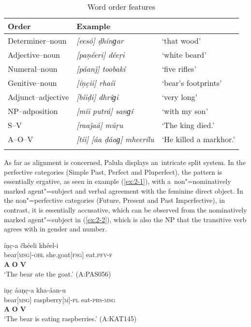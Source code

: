 \begin{table}[ht]
\caption{Word order features}
\begin{tabularx}{\textwidth}{ l l Q }
\lsptoprule
Order &
Example\\\hline
Determiner--noun &
\textit{[eesó] ḍhínɡar} &
`that wood' \\
Adjective--noun &
\textit{[paṇéeri] déeṛi} &
`white beard' \\
Numeral--noun &
\textit{[páanǰ] toobakí} &
`five rifles'\\
Genitive--noun &
\textit{[íṇc̣ii] rhaíi} &
`bear's footprints'\\
Adjunct--adjective &
\textit{[bíiḍi] dhríɡi} &
`very long'\\
NP--adposition &
\textit{[míi putrá] sanɡí} &
`with my son'\\
S--V &
\textit{[raaǰaá] múṛu} &
`The king died.'\\
A--O--V &
\textit{[tíi] [áa ḍáaɡ] mheerílu} &
`He killed a markhor.' 
\\\lspbottomrule
\end{tabularx}
\label{tab:2-worder}
\end{table}


As far as alignment is concerned, Palula displays an~intricate split system. In the perfective categories (Simple Past, Perfect and Pluperfect), the pattern is essentially ergative, as seen in example (\ref{ex:2-1}), with a~non"=nominatively marked agent"=subject and verbal agreement with the feminine direct object. In the non"=perfective categories (Future, Present and Past Imperfective), in contrast, it is essentially accusative, which can be observed from the nominatively marked agent"=subject in (\ref{ex:2-2}), which is also the NP that the transitive verb agrees with in gender and number.

\begin{exe}
\ex
\label{ex:2-1}
\glll íṇc̣-a čhéeli khéel-i \\
bear[\textsc{msg}]-\textsc{obl} she.goat[\textsc{fsg}] eat.\textsc{pfv-}\textsc{f}\\
\textbf{A} \textbf{O} \textbf{V}\\
\glt `The bear ate the goat.' (A:PAS056)
\end{exe}


\begin{exe}
\ex
\label{ex:2-2}
\glll iṇc̣ áaṇc̣-a kha-áan-u\\
bear[\textsc{msg}] raspberry[\textsc{m}]-\textsc{pl} eat-\textsc{prs-msg} \\
\textbf{A} \textbf{O} \textbf{V}\\
\glt `The bear is eating raspberries.' (A:KAT145)
\end{exe} 


